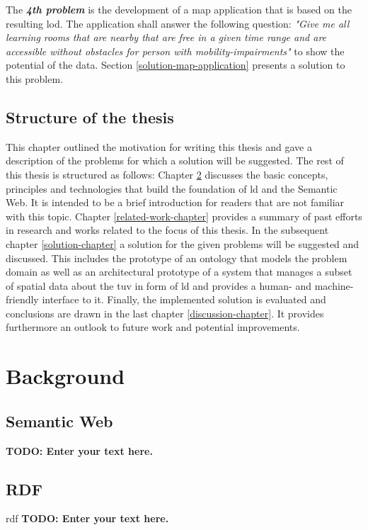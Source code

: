 \documentclass[draft,final]{vutinfth} %
\newcommand{\todo}[1]{{\color{red}\textbf{TODO: {#1}}}} %
\begin{document}
The \textbf{\textit{4th problem}} is the development of a map application that is based on the resulting \gls{lod}. The application shall answer the following question: \textit{"Give me all learning rooms that are nearby that are free in a given time range and are accessible without obstacles for person with mobility-impairments"} to show the potential of the data. Section \ref{solution-map-application} presents a solution to this problem.

\section{Structure of the thesis}
This chapter outlined the motivation for writing this thesis and gave a description of the problems for which a solution will be suggested. The rest of this thesis is structured as follows: Chapter \ref{background-chapter} discusses the basic concepts, principles and technologies that build the foundation of \gls{ld} and the Semantic Web. It is intended to be a brief introduction for readers that are not familiar with this topic. Chapter \ref{related-work-chapter} provides a summary of past efforts in research and works related to the focus of this thesis. In the subsequent chapter \ref{solution-chapter} a solution for the given problems will be suggested and discussed. This includes the prototype of an ontology that models the problem domain as well as an architectural prototype of a system that manages a subset of spatial data about the \gls{tuv} in form of \gls{ld} and provides a human- and machine-friendly interface to it. Finally, the implemented solution is evaluated and conclusions are drawn in the last chapter \ref{discussion-chapter}. It provides furthermore an outlook to future work and potential improvements. 

\chapter{Background}
\label{background-chapter}

\section{Semantic Web}
\todo{Enter your text here.}

\section{RDF}
\gls{rdf}
\todo{Enter your text here.}
\end{document}
